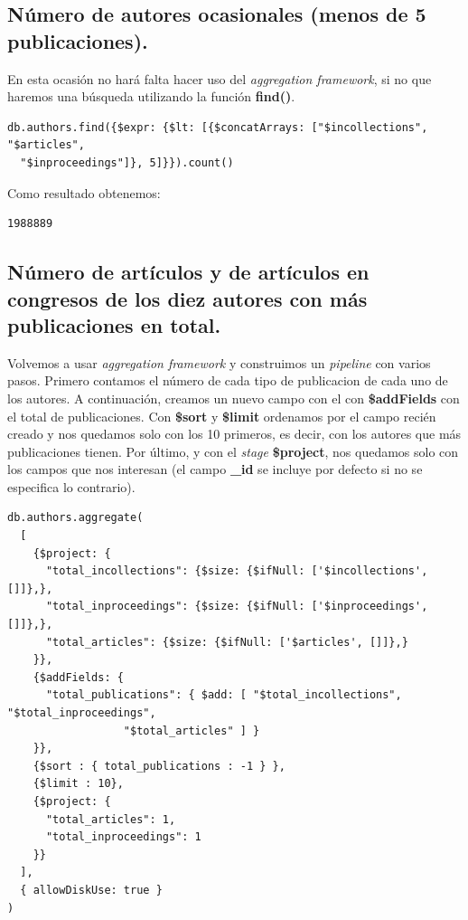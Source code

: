 \subsection{Número de autores ocasionales (menos de 5 publicaciones).}

En esta ocasión no hará falta hacer uso del \textit{aggregation framework}, si no que haremos una búsqueda utilizando la función \textbf{find()}.

\begin{verbatim}
db.authors.find({$expr: {$lt: [{$concatArrays: ["$incollections", "$articles",
  "$inproceedings"]}, 5]}}).count()
\end{verbatim}


Como resultado obtenemos:

\begin{verbatim}
1988889
\end{verbatim}

\subsection{Número de artículos y de artículos en congresos de los diez autores con más publicaciones en total.}

Volvemos a usar \textit{aggregation framework} y construimos un \textit{pipeline} con varios pasos. Primero contamos el número de cada tipo de publicacion de cada uno de los autores. A continuación, creamos un nuevo campo con el con \textbf{\$addFields} con el total de publicaciones. Con \textbf{\$sort} y \textbf{\$limit} ordenamos por el campo recién creado y nos quedamos solo con los 10 primeros, es decir, con los autores que más publicaciones tienen. Por último, y con el \textit{stage} \textbf{\$project}, nos quedamos solo con los campos que nos interesan (el campo \textbf{\_id} se incluye por defecto si no se especifica lo contrario).

\begin{verbatim}
db.authors.aggregate(
  [
    {$project: {
      "total_incollections": {$size: {$ifNull: ['$incollections', []]},},
      "total_inproceedings": {$size: {$ifNull: ['$inproceedings', []]},},
      "total_articles": {$size: {$ifNull: ['$articles', []]},}
    }},
    {$addFields: {
      "total_publications": { $add: [ "$total_incollections", "$total_inproceedings",
                  "$total_articles" ] }
    }},
    {$sort : { total_publications : -1 } },
    {$limit : 10},
    {$project: {
      "total_articles": 1,
      "total_inproceedings": 1
    }}
  ],
  { allowDiskUse: true }
)
\end{verbatim}


